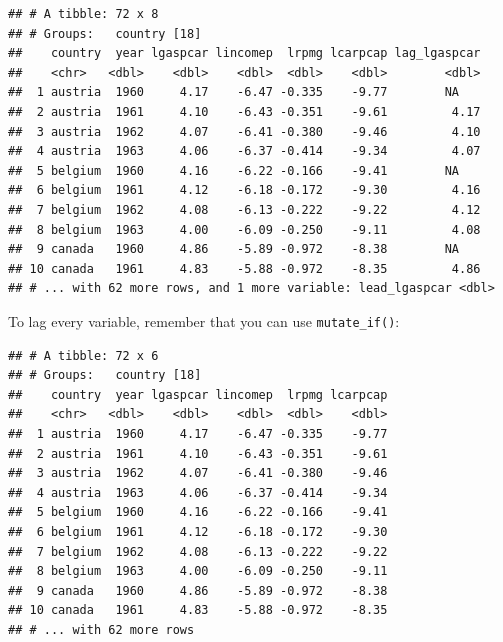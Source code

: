 \documentclass[]{gitbook}
\newenvironment{Shaded}{\begin{snugshade}}{\end{snugshade}}
\newcommand{\DecValTok}[1]{\textcolor[rgb]{0.00,0.00,0.81}{#1}}
\newcommand{\KeywordTok}[1]{\textcolor[rgb]{0.13,0.29,0.53}{\textbf{#1}}}
\newcommand{\NormalTok}[1]{#1}
\newcommand{\OperatorTok}[1]{\textcolor[rgb]{0.81,0.36,0.00}{\textbf{#1}}}
\newcommand{\StringTok}[1]{\textcolor[rgb]{0.31,0.60,0.02}{#1}}
\theoremstyle{definition}
\theoremstyle{definition}
\theoremstyle{definition}
\theoremstyle{remark}
\begin{document}
\begin{verbatim}
## # A tibble: 72 x 8
## # Groups:   country [18]
##    country  year lgaspcar lincomep  lrpmg lcarpcap lag_lgaspcar
##    <chr>   <dbl>    <dbl>    <dbl>  <dbl>    <dbl>        <dbl>
##  1 austria  1960     4.17    -6.47 -0.335    -9.77        NA   
##  2 austria  1961     4.10    -6.43 -0.351    -9.61         4.17
##  3 austria  1962     4.07    -6.41 -0.380    -9.46         4.10
##  4 austria  1963     4.06    -6.37 -0.414    -9.34         4.07
##  5 belgium  1960     4.16    -6.22 -0.166    -9.41        NA   
##  6 belgium  1961     4.12    -6.18 -0.172    -9.30         4.16
##  7 belgium  1962     4.08    -6.13 -0.222    -9.22         4.12
##  8 belgium  1963     4.00    -6.09 -0.250    -9.11         4.08
##  9 canada   1960     4.86    -5.89 -0.972    -8.38        NA   
## 10 canada   1961     4.83    -5.88 -0.972    -8.35         4.86
## # ... with 62 more rows, and 1 more variable: lead_lgaspcar <dbl>
\end{verbatim}

To lag every variable, remember that you can use \texttt{mutate\_if()}:

\begin{Shaded}
\end{Shaded}

\begin{verbatim}
## # A tibble: 72 x 6
## # Groups:   country [18]
##    country  year lgaspcar lincomep  lrpmg lcarpcap
##    <chr>   <dbl>    <dbl>    <dbl>  <dbl>    <dbl>
##  1 austria  1960     4.17    -6.47 -0.335    -9.77
##  2 austria  1961     4.10    -6.43 -0.351    -9.61
##  3 austria  1962     4.07    -6.41 -0.380    -9.46
##  4 austria  1963     4.06    -6.37 -0.414    -9.34
##  5 belgium  1960     4.16    -6.22 -0.166    -9.41
##  6 belgium  1961     4.12    -6.18 -0.172    -9.30
##  7 belgium  1962     4.08    -6.13 -0.222    -9.22
##  8 belgium  1963     4.00    -6.09 -0.250    -9.11
##  9 canada   1960     4.86    -5.89 -0.972    -8.38
## 10 canada   1961     4.83    -5.88 -0.972    -8.35
## # ... with 62 more rows
\end{verbatim}
\end{document}
